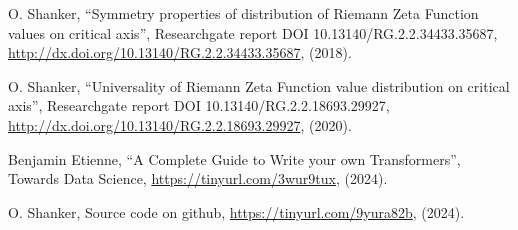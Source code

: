 \documentclass[twoside]{article}
\begin{document}
\begin{thebibliography}{10}
 O. Shanker, 
``Symmetry properties of distribution of Riemann Zeta Function values on critical axis'',
 Researchgate report DOI 10.13140/RG.2.2.34433.35687,
\url{http://dx.doi.org/10.13140/RG.2.2.34433.35687}, 
(2018). 

 O. Shanker, 
``Universality of Riemann Zeta Function value distribution on critical axis'',
 Researchgate report DOI 10.13140/RG.2.2.18693.29927,
\url{http://dx.doi.org/10.13140/RG.2.2.18693.29927}, 
(2020). 

 Benjamin Etienne, 
``A Complete Guide to Write your own Transformers'',
 Towards Data Science,
\url{https://tinyurl.com/3wur9tux}, 
(2024). 

 O. Shanker, 
Source code on github,
\url{https://tinyurl.com/9yura82b}, 
(2024). 



\end{thebibliography} 
\end{document}
